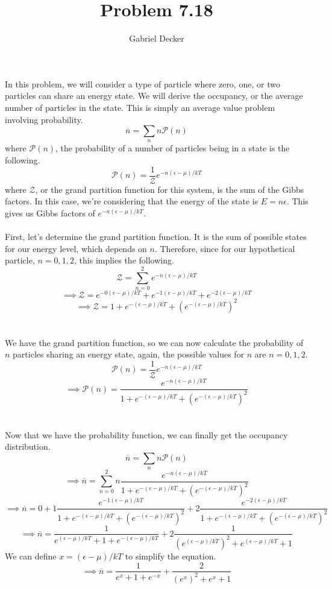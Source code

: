 \documentclass[12pt]{article}
\title{Problem 7.18}
\author{Gabriel Decker}
\newcommand{\ds}{\displaystyle}
\begin{document}
\maketitle
\begin{flushleft}

In this problem, we will consider a type of particle where zero, one, or two particles can share an energy state.
We will derive the occupancy, or the average number of particles in the state.
This is simply an average value problem involving probability.
\begin{equation}
    \overline{n}=\sum_nn\mathcal{P}(n)
\end{equation}
where $\mathcal{P}(n)$, the probability of a number of particles being in a state is the following.
\begin{equation}
    \mathcal{P}(n)=\frac{1}{\mathcal{Z}}e^{-n(\epsilon-\mu)/kT}
\end{equation}
where $\mathcal{Z}$, or the grand partition function for this system, is the sum of the Gibbs factors.
In this case, we're considering that the energy of the state is $E=n\epsilon$.
This gives us Gibbs factors of $e^{-n(\epsilon-\mu)/kT}$.\\~\\

First, let's determine the grand partition function.
It is the sum of possible states for our energy level, which depends on $n$.
Therefore, since for our hypothetical particle, $n=0,1,2$, this implies the following.
$$\mathcal{Z}=\sum_{n=0}^2e^{-n(\epsilon-\mu)/kT}$$
$$\implies\mathcal{Z}=e^{-0(\epsilon-\mu)/kT}+e^{-1(\epsilon-\mu)/kT}+e^{-2(\epsilon-\mu)/kT}$$
$$\implies\mathcal{Z}=1+e^{-(\epsilon-\mu)/kT}+\left(e^{-(\epsilon-\mu)/kT}\right)^2$$\\~\\

We have the grand partition function, so we can now calculate the probability of $n$ particles sharing an energy state, again, the possible values for $n$ are $n=0,1,2$.
$$\mathcal{P}(n)=\frac{1}{\mathcal{Z}}e^{-n(\epsilon-\mu)/kT}$$
$$\implies\mathcal{P}(n)=\frac{\ds e^{-n(\epsilon-\mu)/kT}}{\ds1+e^{-(\epsilon-\mu)/kT}+\left(e^{-(\epsilon-\mu)/kT}\right)^2}$$\\~\\

Now that we have the probability function, we can finally get the occupancy distribution.
$$\overline{n}=\sum_nn\mathcal{P}(n)$$
$$\implies\overline{n}=\sum_{n=0}^2n\frac{\ds e^{-n(\epsilon-\mu)/kT}}{\ds1+e^{-(\epsilon-\mu)/kT}+\left(e^{-(\epsilon-\mu)/kT}\right)^2}$$
$$\implies\overline{n}=0+1\frac{\ds e^{-1(\epsilon-\mu)/kT}}{\ds1+e^{-(\epsilon-\mu)/kT}+\left(e^{-(\epsilon-\mu)/kT}\right)^2}+2\frac{\ds e^{-2(\epsilon-\mu)/kT}}{\ds1+e^{-(\epsilon-\mu)/kT}+\left(e^{-(\epsilon-\mu)/kT}\right)^2}$$
$$\implies\overline{n}=\frac{1}{\ds e^{(\epsilon-\mu)/kT}+1+e^{-(\epsilon-\mu)/kT}}+2\frac{1}{\ds \left(e^{(\epsilon-\mu)/kT}\right)^2+e^{(\epsilon-\mu)/kT}+1}$$
We can define $x=(\epsilon-\mu)/kT$ to simplify the equation.
$$\implies\overline{n}=\frac{1}{\ds e^{x}+1+e^{-x}}+\frac{2}{\ds \left(e^{x}\right)^2+e^{x}+1}$$\\~\\


\end{flushleft}
\end{document}
